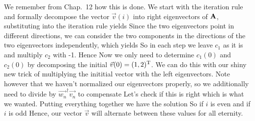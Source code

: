\solution 
We remember from Chap.~12 how this is done. We start with the iteration rule 
and formally decompose the vector $\vec{v}(i)$ into right eigenvectors of ${\bf A}$, 
substituting into the iteration rule yields 
Since the two eigenvectors point in different directions, we can consider the two components in the directions of the two eigenvectors independently, which yields 
So in each step we leave $c_1$ as it is and multiply $c_2$ with -1. Hence 
Now we only need to determine $c_1(0)$ and $c_2(0)$ by decomposing the initial $\vec{v}(0)=(1,2)^{\rm T}$. We can do this with our shiny new trick of multiplying the inititial vector with the left eigenvectors. Note however that we haven't normalized our eigenvectors properly, so we additionally need to divide by $\vec{w_n}^\dag \vec{v_n}$ to compensate 
Let's check if this is right
which is what we wanted. Putting everything together we have the solution 
So if $i$ is even 
and if $i$ is odd 
Hence, our vector $\vec{v}$ will alternate between these values for all eternity.  


